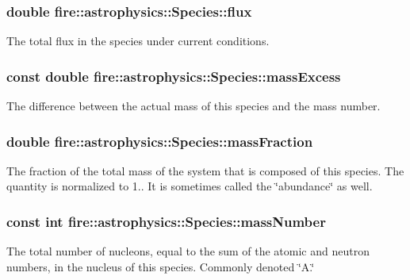 \subsubsection[{\texorpdfstring{flux}{flux}}]{\setlength{\rightskip}{0pt plus 5cm}double fire\+::astrophysics\+::\+Species\+::flux}\hypertarget{a00282_a9a1512c8b681fe0b829b2f91efa8f1a1}{}\label{a00282_a9a1512c8b681fe0b829b2f91efa8f1a1}
The total flux in the species under current conditions. 
\subsubsection[{\texorpdfstring{mass\+Excess}{massExcess}}]{\setlength{\rightskip}{0pt plus 5cm}const double fire\+::astrophysics\+::\+Species\+::mass\+Excess}\hypertarget{a00282_a3fd8c01bcbb27c20fb80cf9a9e6e1f66}{}\label{a00282_a3fd8c01bcbb27c20fb80cf9a9e6e1f66}
The difference between the actual mass of this species and the mass number. 
\subsubsection[{\texorpdfstring{mass\+Fraction}{massFraction}}]{\setlength{\rightskip}{0pt plus 5cm}double fire\+::astrophysics\+::\+Species\+::mass\+Fraction}\hypertarget{a00282_aa23c930af303e0c2b09491b18888855b}{}\label{a00282_aa23c930af303e0c2b09491b18888855b}
The fraction of the total mass of the system that is composed of this species. The quantity is normalized to 1.. It is sometimes called the \char`\"{}abundance\char`\"{} as well. 
\subsubsection[{\texorpdfstring{mass\+Number}{massNumber}}]{\setlength{\rightskip}{0pt plus 5cm}const int fire\+::astrophysics\+::\+Species\+::mass\+Number}\hypertarget{a00282_a403a85b9ffb625643b0bd5cf2e944376}{}\label{a00282_a403a85b9ffb625643b0bd5cf2e944376}
The total number of nucleons, equal to the sum of the atomic and neutron numbers, in the nucleus of this species. Commonly denoted \char`\"{}\+A.\char`\"{} 
